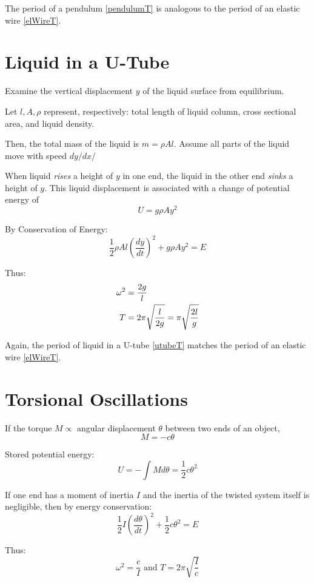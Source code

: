 \documentclass[11pt,letterpaper,titlepage,oneside]{book}
\begin{document}
The period of a pendulum \eqref{pendulumT} is analogous to the period of an elastic wire \eqref{elWireT}.

\section{Liquid in a U-Tube}
Examine the vertical displacement $y$ of the liquid surface from equilibrium.

Let $l, A, \rho$ represent, respectively: total length of liquid column, cross sectional area, and liquid density.

Then, the total mass of the liquid is $m=\rho Al$. Assume all parts of the liquid move with speed $dy/dx$/

When liquid \textit{rises} a height of $y$ in one end, the liquid in the other end \textit{sinks} a height of $y$. This liquid displacement is associated with a change of potential energy of
\[ U = g\rho Ay^2 \]

By Conservation of Energy:
\[ \frac{1}{2}\rho Al \left( \frac{dy}{dt} \right)^2 + g\rho Ay^2 = E  \] 

Thus:
\begin{align}
\omega^2 &= \frac{2g}{l} \notag \\
T &= 2\pi\sqrt{\frac{l}{2g}} = \pi\sqrt{\frac{2l}{g}} \label{utubeT}
\end{align}

Again, the period of liquid in a U-tube \eqref{utubeT} matches the period of an elastic wire \eqref{elWireT}.

\section{Torsional Oscillations}
If the torque $M \propto$ angular displacement $\theta$ between two ends of an object,
\[ M=-c\theta \tag*{where $c$ is the torsion constant of the system.} \]

Stored potential energy: \[ U= -\int M d\theta = \frac{1}{2} c\theta^2 \]

If one end has a moment of inertia $I$ and the inertia of the twisted system itself is negligible, then by energy conservation:
\[ \frac{1}{2}I\left( \frac{d\theta}{dt}\right)^2 + \frac{1}{2} c\theta^2 = E \]

Thus:
\begin{equation}
\omega^2 = \frac{c}{I} \text{ and } T = 2\pi\sqrt{\frac{I}{c}} \label{torsionalT}
\end{equation}
\end{document}

